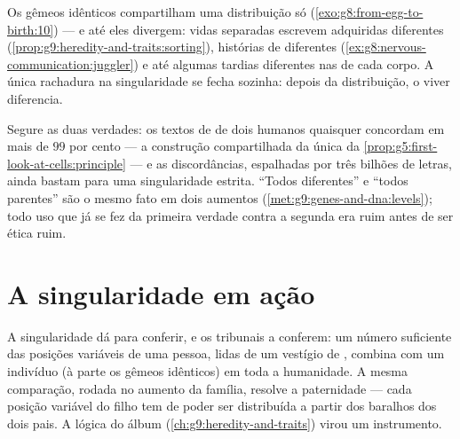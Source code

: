 \begin{example}\label{ex:g9:unique-individuals:twins}
Os gêmeos idênticos compartilham uma distribuição só
(\cref{exo:g8:from-egg-to-birth:10}) --- e até eles divergem:
vidas separadas escrevem  adquiridas
diferentes (\cref{prop:g9:heredity-and-traits:sorting}),
histórias de  diferentes
(\cref{ex:g8:nervous-communication:juggler}) e até algumas
 tardias diferentes nas  de cada corpo. A
única rachadura na singularidade se fecha sozinha: depois da
distribuição, o viver diferencia.
\end{example}

\begin{remark}\label{rem:g9:unique-individuals:alike}
Segure as duas verdades: os textos de  de dois humanos
quaisquer concordam em mais de $99$ por cento --- a
construção compartilhada da  única da
\cref{prop:g5:first-look-at-cells:principle} --- e as
discordâncias, espalhadas por três bilhões de letras, ainda
bastam para uma singularidade estrita. ``Todos diferentes'' e
``todos parentes'' são o mesmo fato em dois aumentos
(\cref{met:g9:genes-and-dna:levels}); todo uso que já se fez
da primeira verdade contra a segunda era  ruim antes
de ser ética ruim.
\end{remark}

\section{A singularidade em ação}

\begin{example}\label{ex:g9:unique-individuals:forensics}
A singularidade dá para conferir, e os tribunais a conferem:
um número suficiente das posições variáveis de uma pessoa,
lidas de um vestígio de , combina com um indivíduo (à
parte os gêmeos idênticos) em toda a humanidade. A mesma
comparação, rodada no aumento da família, resolve a
paternidade --- cada posição variável do filho tem de poder
ser distribuída a partir dos baralhos dos dois pais. A lógica
do álbum (\cref{ch:g9:heredity-and-traits}) virou um
instrumento.
\end{example}

